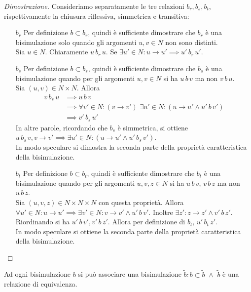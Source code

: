 \begin{proof}[Dimostrazione] Consideriamo separatamente le tre relazioni $b_r, b_s, b_t$, rispettivamente la chiusura riflessiva, simmetrica e transitiva:
    \begin{itemize}
        \item[$b_r$] Per definizione $b \subset b_r$, quindi è sufficiente dimostrare che $b_r$ è una bisimulazione solo quando gli argomenti $u,v \in N$ non sono distinti.\\
        Sia $u \in N$. Chiaramente $u \,b_r\, u$. Se $\exists u' \in N : u \to u' \implies u' \,b_r\, u'$.
        \item[$b_s$] Per definizione $b \subset b_s$, quindi è sufficiente dimostrare che $b_s$ è una bisimulazione quando per gli argomenti $u,v \in N$ si ha $u \,b\, v$ ma non $v \,b\, u$.\\
        Sia $(u,v) \in N \times N$. Allora
        \begin{align*}
            v \,b_s\, u &\implies u \,b\, v\\
            &\implies \forall v' \in N : (v \to v') \,\,\exists u' \in N : (u \to u' \land u' \,b\,v')\\
            &\implies v' \,b_s\, u'
        \end{align*}
        In altre parole, ricordando che $b_s$ è simmetrica, si ottiene $u \,b_s\, v, v \to v' \implies \exists u' \in N : (u \to u' \land u' \,b_s\, v')$.\\
        In modo speculare si dimostra la seconda parte della proprietà caratteristica della bisimulazione.
        \item[$b_t$] Per definizione $b \subset b_t$, quindi è sufficiente dimostrare che $b_t$ è una bisimulazione quando per gli argomenti $u,v,z \in N$ si ha $u \,b\, v$, $v \,b\, z$ ma non $u \,b\, z$.\\
        Sia $(u,v,z) \in N \times N \times N$ con questa proprietà. Allora $\forall u' \in N : u \to u' \implies \exists v' \in N : v \to v' \land u' \,b\, v'$. Inoltre $\exists z' : z \to z' \land v' \,b\, z'$.\\
        Riordinando si ha $u' \,b\, v', v' \,b\, z'$. Allora per definizione di $b_t, \, u' \,b_t\, z'$.\\
        In modo speculare si ottiene la seconda parte della proprietà caratteristica della bisimulazione.\\
    \end{itemize}
\end{proof}
\begin{corollary}
    Ad ogni bisimulazione $b$ si può associare una bisimulazione $\widetilde{b} : b \subset \widetilde{b} \,\,\land\,\, \widetilde{b}$ è una relazione di equivalenza.
\end{corollary}
